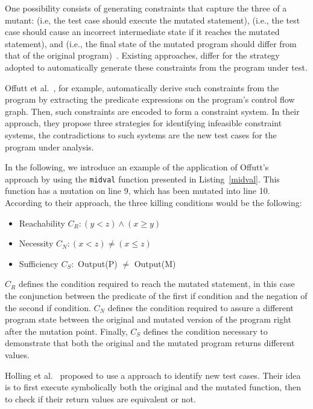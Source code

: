 One possibility consists of generating constraints that capture the three  of a mutant:  (i.e, the test case should execute the mutated statement),  (i.e., the test case should cause an incorrect intermediate state if it reaches the mutated statement), and  (i.e., the final state of the mutated program should differ from that of the original program)~\cite{offutt1997automatically}. Existing approaches, differ for the strategy adopted to automatically generate these constraints from the program under test.

Offutt et al.~\cite{offutt1997automatically}, for example, automatically derive such constraints from the program by extracting the predicate expressions on the program's control flow graph.
Then, such constraints are encoded to form a constraint system. In their approach, they propose three strategies for identifying infeasible constraint systems, the contradictions to such systems are the new test cases for the program under analysis.



In the following, we introduce an example of the application of Offutt's~\cite{offutt1997automatically} approach by using the \texttt{midval} function presented in Listing~\ref{midval}. This function has a mutation on line 9, which has been mutated into line 10. According to their approach, the three killing conditions would be the following:

\begin{itemize}
	\item Reachability $C_R: (y < z) \wedge (x \geq y)$
	\item Necessity $C_N: (x < z) \neq (x \leq z)$
	\item Sufficiency $C_S:$ Output(P) $\neq$ Output(M)
\end{itemize}

$C_R$ defines the condition required to reach the mutated statement, in this case the conjunction between the predicate of the first if condition and the negation of the second if condition. $C_N$ defines the condition required to assure a different program state between the original and mutated version of the program right after the mutation point. Finally, $C_S$ defines the condition necessary to demonstrate that both the original and the mutated program returns different values.

Holling et al.~\cite{holling2016nequivack} proposed to use a  approach to identify new test cases. Their idea is to first execute symbolically both the original and the mutated function, then to check if their return values are equivalent or not. 

